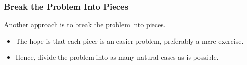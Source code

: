 \documentclass{beamer}
\begin{document}

\fi

\begin{frame}%
\frametitle{Break the Problem Into Pieces}

Another approach is to break the problem into pieces.

\begin{itemize}

\vspace{0.2cm}

\item<1-> The hope is that each piece
is an easier problem, preferably a mere exercise.

\vspace{0.2cm}

\item<1-> Hence, divide the problem into as many
natural cases as is possible.

\end{itemize}



\end{frame}
\end{document}
